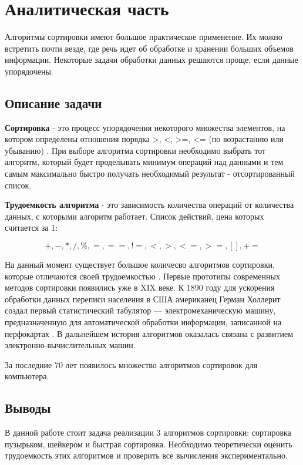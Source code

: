 \newpage
\section{Аналитическая часть}

Алгоритмы сортировки имеют большое практическое применение. Их можно встретить почти везде,
где речь идет об обработке и хранении больших объемов информации. Некоторые задачи обработки
данных решаются проще, если данные упорядочены.

\subsection{Описание задачи}

\textbf{Сортировка} - это процесс упорядочения некоторого множества элементов,
на котором определены отношения порядка >, <, >=, <= (по возрастанию или убыванию) \cite{pav}.
При выборе алгоритма сортировки необходимо выбрать тот алгоритм, который будет проделывать
минимум операций над данными и тем самым максимально быстро получать необходимый результат -
отсортированный список.

\textbf{Трудоемкость алгоритма} - это зависимость количества операций от количества
данных, с которыми алгоритм работает. Список действий, цена которых считается за 1:

$$
+, -, *, /, \%, =, ==, !=, <, >, <=, >=, [], +=
$$

На данный момент существует большое количесво алгоритмов сортировки, которые отличаются
своей трудоемкостью \cite{knuth}. Первые прототипы современных методов сортировки появились уже
в XIX веке. К 1890 году для ускорения обработки данных переписи населения в США американец
Герман Холлерит создал первый статистический табулятор — электромеханическую машину,
предназначенную для автоматической обработки информации, записанной на перфокартах
\cite{eniac}.
В дальнейшем история алгоритмов оказалась связана с развитием электронно-вычислительных машин.

За последние 70 лет появилось множество алгоритмов сортировок для компьютера.\cite{knuth}

\subsection{Выводы}

В данной работе стоит задача реализации 3 алгоритмов сортировки: сортировка пузырьком,
шейкером и быстрая сортировка. Необходимо теоретически оценить трудоемкость этих алгоритмов
и проверить все вычисления экспериментально.
